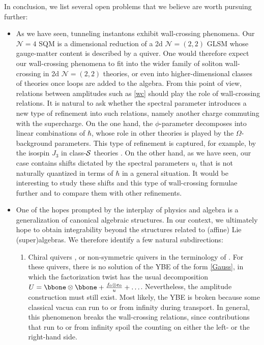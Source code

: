 \documentclass[10pt]{article}
\theoremstyle{definition}
\def\CS {{\cal S}}
\numberwithin{equation}{section}
\begin{document}
In conclusion, we list several open problems that we believe are worth pursuing further:
\begin{itemize}
	\item As we have seen, tunneling instantons exhibit wall-crossing phenomena.
	Our $\mathcal{N}=4$ SQM is a dimensional reduction of a 2d $\mathcal{N}=(2,2)$ GLSM whose gauge-matter content is described by a quiver.
	One would therefore expect our wall-crossing phenomena to fit into the wider family of soliton wall-crossing in 2d $\mathcal{N}=(2,2)$ theories, or even into higher-dimensional classes of theories once loops are added to the algebra.
	From this point of view, relations between amplitudes such as \eqref{wc} should play the role of wall-crossing relations.
	It is natural to ask whether the spectral parameter introduces a new type of refinement into such relations, namely another charge commuting with the supercharge.
	On the one hand, the $\phi$-parameter decomposes into linear combinations of $\hbar$, whose role in other theories is played by the $\Omega$-background parameters.
	This type of refinement is captured, for example, by the isospin $J_3$ in class-$\CS$ theories \cite{Moore2012FelixKlein}.
	On the other hand, as we have seen, our case contains shifts dictated by the spectral parameters $u_i$ that is not naturally quantized in terms of $\hbar$ in a general situation.
	It would be interesting to study these shifts and this type of wall-crossing formulae further and to compare them with other refinements.
	\item One of the hopes prompted by the interplay of physics and algebra is a generalization of canonical algebraic structures.
	In our context, we ultimately hope to obtain integrability beyond the structures related to (affine) Lie (super)algebras.
	We therefore identify a few natural subdirections:
	\begin{enumerate}
		\item Chiral quivers \cite{Galakhov:2022uyu}, or non-symmetric quivers in the terminology of \cite{Cao:2026vwf}.
		For these quivers, there is no solution of the YBE of the form \eqref{Gauss}, in which the factorization twist has the usual decomposition $U=\bbone\otimes \bbone+\frac{f_0\otimes e_0}{u}+\ldots$.
		Nevertheless, the amplitude construction must still exist.
		Most likely, the YBE is broken because some classical vacua can run to or from infinity during transport.
		In general, this phenomenon breaks the wall-crossing relations, since contributions that run to or from infinity spoil the counting on either the left- or the right-hand side.

\end{enumerate}
\end{itemize}
\end{document}
